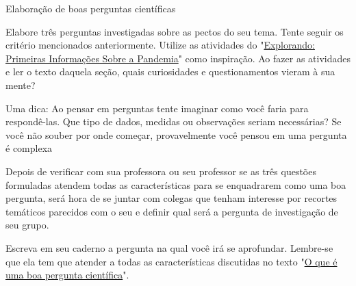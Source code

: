 


\begin{task}{Elaboração de boas perguntas científicas}

Elabore três perguntas investigadas sobre as pectos do seu tema. Tente seguir os critério mencionados anteriormente. Utilize as atividades do "\hyperref[primeiras-informacoes]{Explorando: Primeiras Informações Sobre a Pandemia}"{} como inspiração. Ao fazer as atividades e ler o texto daquela seção, quais curiosidades e questionamentos vieram à sua mente?

Uma dica: Ao pensar em perguntas tente imaginar como você faria para respondê-las. Que tipo de dados, medidas ou observações seriam necessárias? Se você não souber por onde começar, provavelmente você pensou em uma pergunta é complexa

Depois de verificar com sua professora ou seu professor se as três questões formuladas atendem todas as características para se enquadrarem como uma boa pergunta, será hora de se juntar com colegas que tenham interesse por recortes temáticos parecidos com o seu e definir qual será a pergunta de investigação de seu grupo.

Escreva em seu caderno a pergunta na qual você irá se aprofundar. Lembre-se que ela tem que atender a todas as características discutidas no texto "\hyperref[pergunta-cientifica]{O que é uma boa pergunta científica}".

\end{task}

